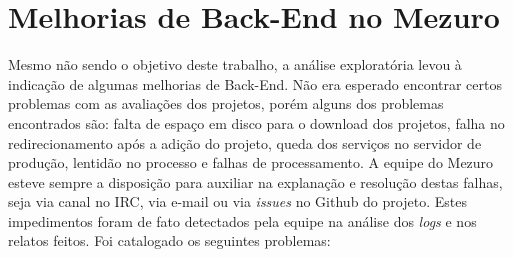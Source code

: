\section{Melhorias de Back-End no Mezuro}

Mesmo não sendo o objetivo deste trabalho, a análise exploratória levou à
indicação de algumas melhorias de Back-End. Não era esperado encontrar certos
problemas com as avaliações dos projetos, porém alguns dos problemas encontrados
são: falta de espaço em disco para o download dos projetos, falha no
redirecionamento após a adição do projeto, queda dos serviços no servidor de
produção, lentidão no processo e falhas de processamento. A equipe do Mezuro
esteve sempre a disposição para auxiliar na explanação e resolução destas
falhas, seja via canal no IRC, via e-mail ou via \textit{issues} no Github do
projeto. Estes impedimentos foram de fato detectados pela equipe na análise dos
\textit{logs} e nos relatos feitos. Foi catalogado os seguintes problemas:

